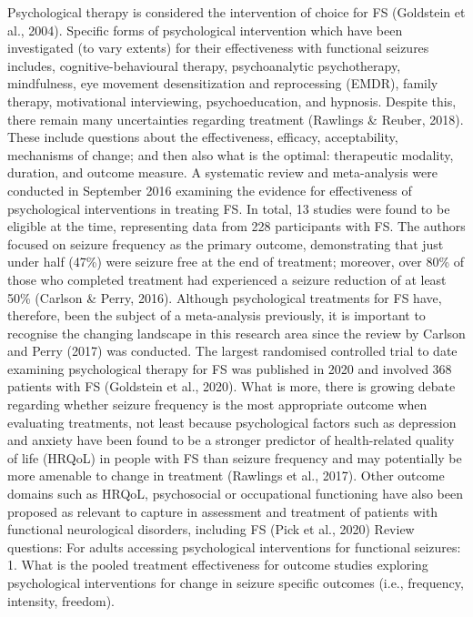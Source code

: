 \documentclass[
  12pt,
  openany]{book}
\begin{document}
Psychological therapy is considered the intervention of choice for FS (Goldstein et al., 2004). Specific forms of psychological intervention which have been investigated (to vary extents) for their effectiveness with functional seizures includes, cognitive-behavioural therapy, psychoanalytic psychotherapy, mindfulness, eye movement desensitization and reprocessing (EMDR), family therapy, motivational interviewing, psychoeducation, and hypnosis. Despite this, there remain many uncertainties regarding treatment (Rawlings \& Reuber, 2018). These include questions about the effectiveness, efficacy, acceptability, mechanisms of change; and then also what is the optimal: therapeutic modality, duration, and outcome measure. A systematic review and meta-analysis were conducted in September 2016 examining the evidence for effectiveness of psychological interventions in treating FS. In total, 13 studies were found to be eligible at the time, representing data from 228 participants with FS. The authors focused on seizure frequency as the primary outcome, demonstrating that just under half (47\%) were seizure free at the end of treatment; moreover, over 80\% of those who completed treatment had experienced a seizure reduction of at least 50\% (Carlson \& Perry, 2016).
Although psychological treatments for FS have, therefore, been the subject of a meta-analysis previously, it is important to recognise the changing landscape in this research area since the review by Carlson and Perry (2017) was conducted. The largest randomised controlled trial to date examining psychological therapy for FS was published in 2020 and involved 368 patients with FS (Goldstein et al., 2020). What is more, there is growing debate regarding whether seizure frequency is the most appropriate outcome when evaluating treatments, not least because psychological factors such as depression and anxiety have been found to be a stronger predictor of health-related quality of life (HRQoL) in people with FS than seizure frequency and may potentially be more amenable to change in treatment (Rawlings et al., 2017). Other outcome domains such as HRQoL, psychosocial or occupational functioning have also been proposed as relevant to capture in assessment and treatment of patients with functional neurological disorders, including FS (Pick et al., 2020)
Review questions:
For adults accessing psychological interventions for functional seizures:
1. What is the pooled treatment effectiveness for outcome studies exploring psychological interventions for change in seizure specific outcomes (i.e., frequency, intensity, freedom).
\end{document}
